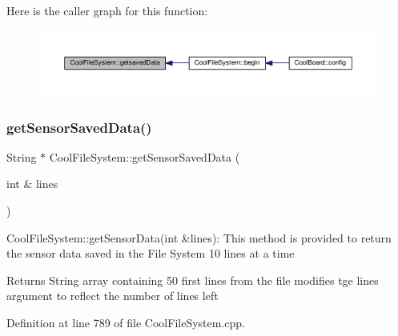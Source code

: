 Here is the caller graph for this function\+:
\nopagebreak
\begin{figure}[H]
\begin{center}
\leavevmode
\includegraphics[width=350pt]{db/d0c/class_cool_file_system_a70701d05e811604af1b531f4f6dc69ed_icgraph}
\end{center}
\end{figure}
\mbox{\label{class_cool_file_system_a3223ffff4266a6300988fab956d6b4b2}} 
\subsubsection{\texorpdfstring{get\+Sensor\+Saved\+Data()}{getSensorSavedData()}}
{\footnotesize\ttfamily String $\ast$ Cool\+File\+System\+::get\+Sensor\+Saved\+Data (\begin{DoxyParamCaption}\item[{int \&}]{lines }\end{DoxyParamCaption})}

Cool\+File\+System\+::get\+Sensor\+Data(int \&lines)\+: This method is provided to return the sensor data saved in the File System 10 lines at a time

\begin{DoxyReturn}{Returns}
String array containing 50 first lines from the file modifies tge lines argument to reflect the number of lines left 
\end{DoxyReturn}


Definition at line 789 of file Cool\+File\+System.\+cpp.


